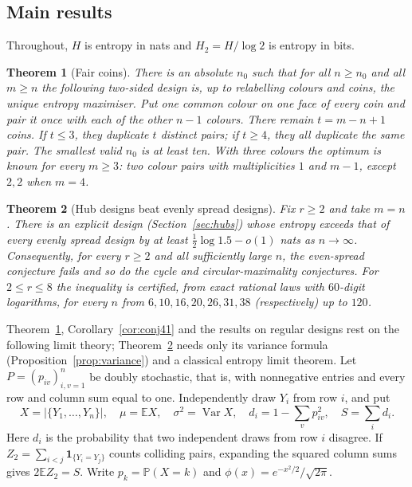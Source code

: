 \documentclass[11pt,a4paper]{article}
\newtheorem{mainthm}{Theorem}\renewcommand{\themainthm}{\Alph{mainthm}}
\theoremstyle{definition}\newtheorem{remark}[theorem]{Remark}\newtheorem{conjecture}{Conjecture}
\newcommand{\E}{\mathbb E}\newcommand{\Prb}{\mathbb P}\newcommand{\Var}{\operatorname{Var}}
\newcommand{\ind}{\mathbf 1}\newcommand{\eps}{\varepsilon}\newcommand{\dist}{d_{\rm TV}}
\begin{document}
\subsection{Main results}
Throughout, $H$ is entropy in nats and $H_2=H/\log 2$ is entropy in bits.

\begin{mainthm}[Fair coins]\label{thm:A}
There is an absolute $n_0$ such that for all $n\ge n_0$ and all $m\ge n$ the following two-sided design is, up to relabelling colours and coins, the unique entropy maximiser. Put one common colour on one face of every coin and pair it once with each of the other $n-1$ colours. There remain $t=m-n+1$ coins. If $t\le3$, they duplicate $t$ distinct pairs; if $t\ge4$, they all duplicate the same pair. The smallest valid $n_0$ is at least ten. With three colours the optimum is known for every $m\ge3$: two colour pairs with multiplicities $1$ and $m-1$, except $2,2$ when $m=4$.
\end{mainthm}

\begin{mainthm}[Hub designs beat evenly spread designs]\label{thm:B}
Fix $r\ge2$ and take $m=n$. There is an explicit design (Section~\ref{sec:hubs}) whose entropy exceeds that of every evenly spread design by at least $\tfrac12\log 1.5-o(1)$ nats as $n\to\infty$. Consequently, for every $r\ge2$ and all sufficiently large $n$, the even-spread conjecture fails and so do the cycle and circular-maximality conjectures. For $2\le r\le 8$ the inequality is certified, from exact rational laws with $60$-digit logarithms, for every $n$ from $6,10,16,20,26,31,38$ (respectively) up to $120$.
\end{mainthm}

Theorem~\ref{thm:A}, Corollary~\ref{cor:conj41} and the results on regular designs rest on the following limit theory; Theorem~\ref{thm:B} needs only its variance formula (Proposition~\ref{prop:variance}) and a classical entropy limit theorem. Let $P=(p_{iv})_{i,v=1}^n$ be doubly stochastic, that is, with nonnegative entries and every row and column sum equal to one. Independently draw $Y_i$ from row $i$, and put
\[
 X=|\{Y_1,\ldots,Y_n\}|,\quad \mu=\E X,\quad \sigma^2=\Var X,\quad
 d_i=1-\sum_v p_{iv}^2,\quad S=\sum_i d_i .
\]
Here $d_i$ is the probability that two independent draws from row $i$ disagree. If $Z_2=\sum_{i<j}\ind_{\{Y_i=Y_j\}}$ counts colliding pairs, expanding the squared column sums gives $2\E Z_2=S$. Write $p_k=\Prb(X=k)$ and $\phi(x)=e^{-x^2/2}/\sqrt{2\pi}$.
\end{document}
